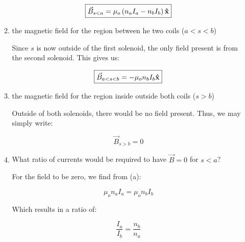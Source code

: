 \begin{enumerate}
\begin{enumerate}
        $$\boxed{\vec{B}_{s<a}=\mu_o\left( n_aI_a-n_bI_b \right)\bold{\hat{x}}}$$

      \item the magnetic field for the region between he two coils ($a<s<b$)

        Since $s$ is now outside of the first solenoid, the only field present is from the second solenoid. This gives us:

        $$\boxed{\vec{B}_{a<s<b}=-\mu_on_bI_b\bold{\hat{x}}}$$

      \item the magnetic field for the region inside outside both coils ($s>b$)

        Outside of both solenoids, there would be no field present. Thus, we may simply write:

        $$\boxed{\vec{B}_{s>b}=0}$$

      \item What ratio of currents would be required to have $\vec{B}=0$ for $s<a$?

        For the field to be zero, we find from (a):

        $$\mu_on_aI_a=\mu_on_bI_b$$

        Which results in a ratio of:

        $$\boxed{\frac{I_a}{I_b}=\frac{n_b}{n_a}}$$

    \end{enumerate}

\end{enumerate}



